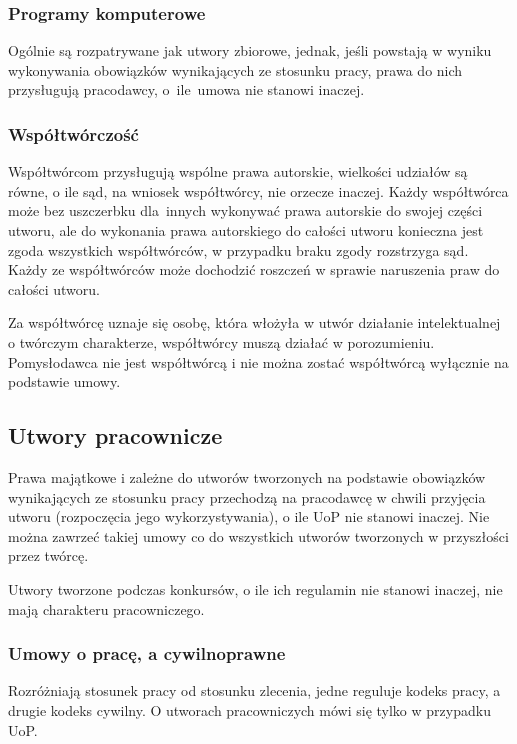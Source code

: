 \documentclass{article}
\begin{document}
\subsubsection{Programy komputerowe}

Ogólnie są rozpatrywane jak utwory zbiorowe, jednak, jeśli powstają w wyniku wykonywania obowiązków wynikających ze stosunku pracy, prawa do nich przysługują pracodawcy, o~ile~umowa nie stanowi inaczej.

\subsubsection{Współtwórczość}

Współtwórcom przysługują wspólne prawa autorskie, wielkości udziałów są równe, o ile sąd, na wniosek współtwórcy, nie orzecze inaczej.
Każdy współtwórca może bez uszczerbku dla~innych wykonywać prawa autorskie do swojej części utworu,
ale do wykonania prawa autorskiego do całości utworu konieczna jest zgoda wszystkich współtwórców, w przypadku braku zgody rozstrzyga sąd.
Każdy ze współtwórców może dochodzić roszczeń w sprawie naruszenia praw do całości utworu.

Za współtwórcę uznaje się osobę, która włożyła w utwór działanie intelektualnej o twórczym charakterze, współtwórcy muszą działać w porozumieniu.
Pomysłodawca nie jest współtwórcą i nie można zostać współtwórcą wyłącznie na podstawie umowy.

\subsection{Utwory pracownicze}

Prawa majątkowe i zależne do utworów tworzonych na podstawie obowiązków wynikających ze stosunku pracy przechodzą na pracodawcę w chwili przyjęcia utworu (rozpoczęcia jego wykorzystywania), o ile UoP nie stanowi inaczej.
Nie można zawrzeć takiej umowy co do wszystkich utworów tworzonych w przyszłości przez twórcę.

Utwory tworzone podczas konkursów, o ile ich regulamin nie stanowi inaczej, nie mają charakteru pracowniczego.

\newpage

\subsubsection{Umowy o pracę, a cywilnoprawne}

Rozróżniają stosunek pracy od stosunku zlecenia, jedne reguluje kodeks pracy, a drugie kodeks cywilny. O utworach pracowniczych mówi się tylko w przypadku UoP.
\end{document}
